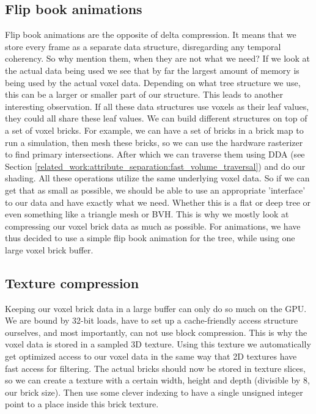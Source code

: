 \subsection{Flip book animations} \label{approach:flipbook_animations}
Flip book animations are the opposite of delta compression. It means that we store every frame as a separate data structure, disregarding any temporal coherency. So why mention them, when they are not what we need? If we look at the actual data being used we see that by far the largest amount of memory is being used by the actual voxel data. Depending on what tree structure we use, this can be a larger or smaller part of our structure. This leads to another interesting observation. If all these data structures use voxels as their leaf values, they could all share these leaf values. We can build different structures on top of a set of voxel bricks. For example, we can have a set of bricks in a brick map to run a simulation, then mesh these bricks, so we can use the hardware rasterizer to find primary intersections. After which we can traverse them using DDA (see Section \ref{related_work:attribute_separation:fast_volume_traversal}) and do our shading. All these operations utilize the same underlying voxel data. So if we can get that as small as possible, we should be able to use an appropriate 'interface' to our data and have exactly what we need. Whether this is a flat or deep tree or even something like a triangle mesh or BVH. This is why we mostly look at compressing our voxel brick data as much as possible. For animations, we have thus decided to use a simple flip book animation for the tree, while using one large voxel brick buffer.

\subsection{Texture compression} \label{approach:texture_compression}
Keeping our voxel brick data in a large buffer can only do so much on the GPU. We are bound by 32-bit loads, have to set up a cache-friendly access structure ourselves, and most importantly, can not use block compression. This is why the voxel data is stored in a sampled 3D texture. Using this texture we automatically get optimized access to our voxel data in the same way that 2D textures have fast access for filtering. The actual bricks should now be stored in texture slices, so we can create a texture with a certain width, height and depth (divisible by 8, our brick size). Then use some clever indexing to have a single unsigned integer point to a place inside this brick texture.


